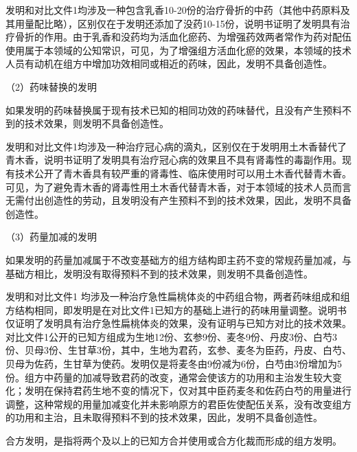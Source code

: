 {\par}

发明和对比文件1均涉及一种包含乳香10-20份的治疗骨折的中药（其他中药原料及其用量配比略），区别仅在于发明还添加了没药10-15份，说明书证明了发明具有治疗骨折的作用。由于乳香和没药均为活血化瘀药、为增强药效两者常作为药对配伍使用属于本领域的公知常识，可见，为了增强组方活血化瘀的效果，本领域的技术人员有动机在组方中增加功效相同或相近的药味，因此，发明不具备创造性。

{\setlength{\parindent}{17.1bp}（2）药味替换的发明\par}

如果发明的药味替换属于现有技术已知的相同功效的药味替代，且没有产生预料不到的技术效果，则发明不具备创造性。

{\par}

发明和对比文件1均涉及一种治疗冠心病的滴丸，区别仅在于发明用土木香替代了青木香，说明书证明了发明具有治疗冠心病的效果且不具有肾毒性的毒副作用。现有技术公开了青木香具有较严重的肾毒性、临床使用时可以用土木香代替青木香。可见，为了避免青木香的肾毒性用土木香代替青木香，对于本领域的技术人员而言无需付出创造性的劳动，且发明没有产生预料不到的技术效果，因此，发明不具备创造性。

{\setlength{\parindent}{17.1bp}（3）药量加减的发明\par}

如果发明的药量加减属于不改变基础方的组方结构即主药不变的常规药量加减，与基础方相比，发明没有取得预料不到的技术效果，则发明不具备创造性。

{\par}

发明和对比文件1 均涉及一种治疗急性扁桃体炎的中药组合物，两者药味组成和组方结构相同，即发明是在对比文件1已知方的基础上进行的药味用量调整。说明书仅证明了发明具有治疗急性扁桃体炎的效果，没有证明与已知方对比的技术效果。对比文件1公开的已知方组成为生地12份、玄参9份、麦冬9份、丹皮3份、白芍3份、贝母3份、生甘草3份，其中，生地为君药，玄参、麦冬为臣药，丹皮、白芍、贝母为佐药，生甘草为使药。发明仅是将麦冬由9份减为6份，白芍由3份增加为5份。组方中药量的加减导致君药的改变，通常会使该方的功用和主治发生较大变化；发明在保持君药生地不变的情况下，仅对其中臣药麦冬和佐药白芍的用量进行调整，这种常规的用量加减变化并未影响原方的君臣佐使配伍关系，没有改变组方的功用和主治，且未取得预料不到的技术效果，因此，发明不具备创造性。

合方发明，是指将两个及以上的已知方合并使用或合方化裁而形成的组方发明。

